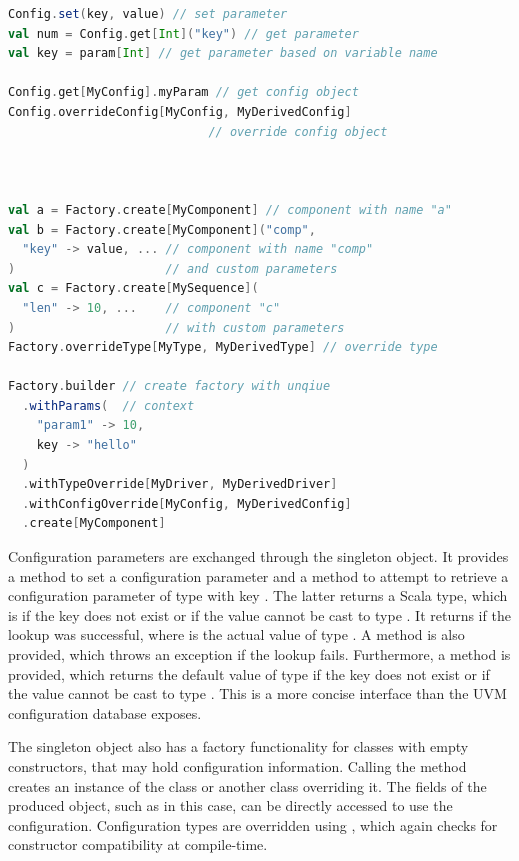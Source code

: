 \begin{listing}
\begin{lstlisting}[language=scala, captionpos=b, caption={Demonstration of the API for the four different factories for components, sequences, transactions and configuration objects.},label=lst:factory]
Config.set(key, value) // set parameter
val num = Config.get[Int]("key") // get parameter
val key = param[Int] // get parameter based on variable name

Config.get[MyConfig].myParam // get config object
Config.overrideConfig[MyConfig, MyDerivedConfig] 
                            // override config object



val a = Factory.create[MyComponent] // component with name "a"
val b = Factory.create[MyComponent]("comp",  
  "key" -> value, ... // component with name "comp"
)                     // and custom parameters
val c = Factory.create[MySequence](
  "len" -> 10, ...    // component "c"
)                     // with custom parameters
Factory.overrideType[MyType, MyDerivedType] // override type

Factory.builder // create factory with unqiue
  .withParams(  // context
    "param1" -> 10,
    key -> "hello"
  )
  .withTypeOverride[MyDriver, MyDerivedDriver]
  .withConfigOverride[MyConfig, MyDerivedConfig]
  .create[MyComponent]

\end{lstlisting}
\end{listing}

Configuration parameters are exchanged through the  singleton object. It provides a  method to set a configuration parameter and a  method to attempt to retrieve a configuration parameter of type  with key . The latter returns a Scala  type, which is  if the key does not exist or if the value cannot be cast to type . It returns  if the lookup was successful, where  is the actual value of type . A method  is also provided, which throws an exception if the lookup fails. Furthermore, a  method is provided, which returns the default value of type  if the key does not exist or if the value cannot be cast to type . This is a more concise interface than the UVM configuration database exposes.

The  singleton object also has a factory functionality for classes with empty constructors, that may hold configuration information. Calling the  method creates an instance of the class  or another class overriding it. The fields of the produced object, such as  in this case, can be directly accessed to use the configuration. Configuration types are overridden using , which again checks for constructor compatibility at compile-time. 

